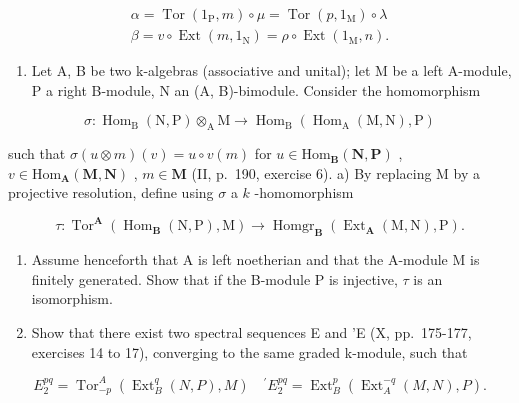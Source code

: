 \[
\begin{array}{l} \alpha = \operatorname{Tor} (1 _ {\mathrm{P}}, m) \circ \mu = \operatorname{Tor} (p, 1 _ {\mathrm{M}}) \circ \lambda \\ \beta = v \circ \operatorname{Ext} (m, 1 _ {\mathrm{N}}) = \rho \circ \operatorname{Ext} (1 _ {\mathrm{M}}, n). \end{array}
\]

\begin{enumerate}
\def\labelenumi{\arabic{enumi})}
\setcounter{enumi}{1}
\tightlist
\item
  Let A, B be two k-algebras (associative and unital); let M be a left A-module, P a right B-module, N an (A, B)-bimodule. Consider the homomorphism
\end{enumerate}

\[
\sigma : \operatorname{Hom} _ {\mathrm{B}} (\mathrm{N}, \mathrm{P}) \otimes_ {\mathrm{A}} \mathrm{M} \rightarrow \operatorname{Hom} _ {\mathrm{B}} (\operatorname{Hom} _ {\mathrm{A}} (\mathrm{M}, \mathrm{N}), \mathrm{P})
\]

such that \(\sigma(u \otimes m)(v) = u \circ v(m)\) for \(u \in \mathrm{Hom}_{\mathbf{B}}(\mathbf{N}, \mathbf{P})\) , \(v \in \mathrm{Hom}_{\mathbf{A}}(\mathbf{M}, \mathbf{N})\) , \(m \in \mathbf{M}\) (II, p.~190, exercise 6). a) By replacing M by a projective resolution, define using \(\sigma\) a \(k\) -homomorphism

\[
\tau : \operatorname{Tor} ^ {\mathbf {A}} \left(\operatorname{Hom} _ {\mathbf {B}} (\mathrm{N}, \mathrm{P}), \mathrm{M}\right)\rightarrow \operatorname{Homgr} _ {\mathbf {B}} \left(\operatorname{Ext} _ {\mathbf {A}} (\mathrm{M}, \mathrm{N}), \mathrm{P}\right).
\]

\begin{enumerate}
\def\labelenumi{\alph{enumi})}
\setcounter{enumi}{1}
\item
  Assume henceforth that A is left noetherian and that the A-module M is finitely generated. Show that if the B-module P is injective, \(\tau\) is an isomorphism.
\item
  Show that there exist two spectral sequences E and 'E (X, pp.~175-177, exercises 14 to 17), converging to the same graded k-module, such that
\end{enumerate}

\[
E _ {2} ^ {p q} = \operatorname{Tor} _ {- p} ^ {A} \left(\operatorname{Ext} _ {B} ^ {q} (N, P), M\right) \quad^ {\prime} E _ {2} ^ {p q} = \operatorname{Ext} _ {B} ^ {p} \left(\operatorname{Ext} _ {A} ^ {- q} (M, N), P\right).
\]

